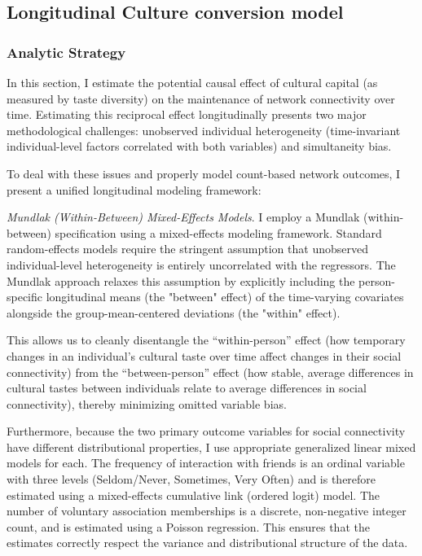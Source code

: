 \documentclass[
]{article}
\begin{document}


\subsection{Longitudinal Culture conversion model}\label{longitudinal-culture-conversion-model}

\subsubsection{Analytic Strategy}\label{analytic-strategy-1}

In this section, I estimate the potential causal effect of cultural capital (as measured by taste diversity) on the maintenance of network connectivity over time. Estimating this reciprocal effect longitudinally presents two major methodological challenges: unobserved individual heterogeneity (time-invariant individual-level factors correlated with both variables) and simultaneity bias.

To deal with these issues and properly model count-based network outcomes, I present a unified longitudinal modeling framework:

\emph{Mundlak (Within-Between) Mixed-Effects Models}. I employ a Mundlak (within-between) specification using a mixed-effects modeling framework. Standard random-effects models require the stringent assumption that unobserved individual-level heterogeneity is entirely uncorrelated with the regressors. The Mundlak approach relaxes this assumption by explicitly including the person-specific longitudinal means (the "between" effect) of the time-varying covariates alongside the group-mean-centered deviations (the "within" effect). 

This allows us to cleanly disentangle the ``within-person'' effect (how temporary changes in an individual's cultural taste over time affect changes in their social connectivity) from the ``between-person'' effect (how stable, average differences in cultural tastes between individuals relate to average differences in social connectivity), thereby minimizing omitted variable bias. 

Furthermore, because the two primary outcome variables for social connectivity have different distributional properties, I use appropriate generalized linear mixed models for each. The frequency of interaction with friends is an ordinal variable with three levels (Seldom/Never, Sometimes, Very Often) and is therefore estimated using a mixed-effects cumulative link (ordered logit) model. The number of voluntary association memberships is a discrete, non-negative integer count, and is estimated using a Poisson regression. This ensures that the estimates correctly respect the variance and distributional structure of the data.
\end{document}
